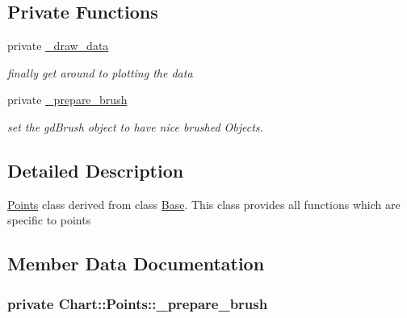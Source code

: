 \subsection*{Private Functions}
\label{_amgrp8d29cff216bafa3117e21883ea7c6b5f}
 \begin{DoxyCompactItemize}
\item 
\hypertarget{classChart_1_1Points_afabf6460cdf4056cdbef97146941f671}{
private \hyperlink{classChart_1_1Points_afabf6460cdf4056cdbef97146941f671}{\_\-draw\_\-data}}
\label{classChart_1_1Points_afabf6460cdf4056cdbef97146941f671}

\begin{DoxyCompactList}\small\item\em finally get around to plotting the data \item\end{DoxyCompactList}\item 
private \hyperlink{classChart_1_1Points_a5573fcfc93e381548349f3b030c24770}{\_\-prepare\_\-brush}
\begin{DoxyCompactList}\small\item\em set the gdBrush object to have nice brushed Objects. \item\end{DoxyCompactList}\end{DoxyCompactItemize}


\subsection{Detailed Description}
\hyperlink{classChart_1_1Points}{Points} class derived from class \hyperlink{classChart_1_1Base}{Base}. This class provides all functions which are specific to points 

\subsection{Member Data Documentation}
\hypertarget{classChart_1_1Points_a5573fcfc93e381548349f3b030c24770}{
\subsubsection[{\_\-prepare\_\-brush}]{\setlength{\rightskip}{0pt plus 5cm}private {\bf Chart::Points::\_\-prepare\_\-brush}}}
\label{classChart_1_1Points_a5573fcfc93e381548349f3b030c24770}


